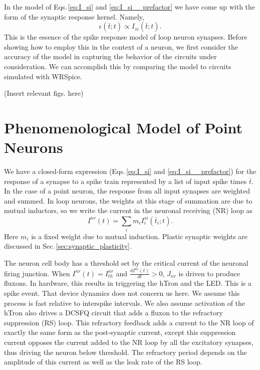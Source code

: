 \documentclass[]{article}
\begin{document}
In the model of Eqs.\,\ref{eq:I_si} and \ref{eq:I_si__prefactor} we have come up with the form of the synaptic response kernel. Namely, 
\begin{equation}
\label{eq:I_si__synaptic_response_kernel}
\epsilon(\bar{t};t) \propto I_{si}(\bar{t};t).
\end{equation}
This is the essence of the spike response model of loop neuron synapses. Before showing how to employ this in the context of a neuron, we first consider the accuracy of the model in capturing the behavior of the circuits under consideration. We can accomplish this by comparing the model to circuits simulated with WRSpice.

(Insert relevant figs. here)

\section{\label{sec:neurons}Phenomenological Model of Point Neurons}
We have a closed-form expression (Eqs.\,\ref{eq:I_si} and \ref{eq:I_si__prefactor}) for the response of a synapse to a spike train represented by a list of input spike times $\bar{t}$. In the case of a point neuron, the response from all input synapses are weighted and summed. In loop neurons, the weights at this stage of summation are due to mutual inductors, so we write the current in the neuronal receiving (NR) loop as
\begin{equation}
\label{eq:I_nr}
I^{nr}(t) = \sum_i m_i I_i^{si}(\bar{t}_i;t).
\end{equation}
Here $m_i$ is a fixed weight due to mutual induction. Plastic synaptic weights are discussed in Sec.\,\ref{sec:synaptic_plasticity}. 

The neuron cell body has a threshold set by the critical current of the neuronal firing junction. When $I^{nr}(t) = I^{nr}_{th}$ and $\frac{dI^{nr}(t)}{dt} > 0$, $J_{nr}$ is driven to produce fluxons. In hardware, this results in triggering the hTron and the LED. This is a spike event. That device dynamics does not concern us here. We assume this process is fast relative to interspike intervals. We also assume activation of the hTron also drives a DCSFQ circuit that adds a fluxon to the refractory suppression (RS) loop. This refractory feedback adds a current to the NR loop of exactly the same form as the post-synaptic current, except this suppression current opposes the current added to the NR loop by all the excitatory synapses, thus driving the neuron below threshold. The refractory period depends on the amplitude of this current as well as the leak rate of the RS loop.
\end{document}
